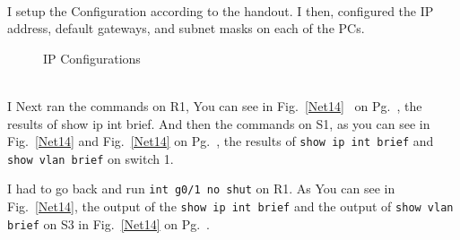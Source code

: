 \documentclass[../EngineeringJournal_CDavis.tex]{subfiles}
\begin{document}
\clearpage


\\
I setup the Configuration according to the handout. I then, configured the IP
address, default gateways, and subnet masks on each of the PCs.


\begin{figure}[!hbt]\centering
{}\hfill
{}\par 
\caption{IP Configurations}\label{IPC14}
\end{figure}

\noindent{}\\
I Next ran the commands on R1, 
You can see in Fig.~\ref{Net14}~ 
on Pg.~\pageref{Net14}, the results of show ip int brief.
And then the commands on S1, as you can see in
Fig.~\ref{Net14} and Fig.~\ref{Net14} 
on Pg.~\pageref{Net14}, the results of 
{\scriptsize{\verb$show ip int brief$}\normalsize}  and 
{\scriptsize{\verb$show vlan brief$}\normalsize}  on
switch 1.

I had to go back
and run {\scriptsize{\verb$int g0/1 no shut$}\normalsize} on R1.
As You can see in Fig.~\ref{Net14}, the output of the
{\scriptsize{\verb$show ip int brief$}\normalsize} 
and the output of {\scriptsize{\verb$show vlan brief$}\normalsize} on S3
in Fig.~\ref{Net14}
on Pg.~\pageref{Net14}.
\end{document}
